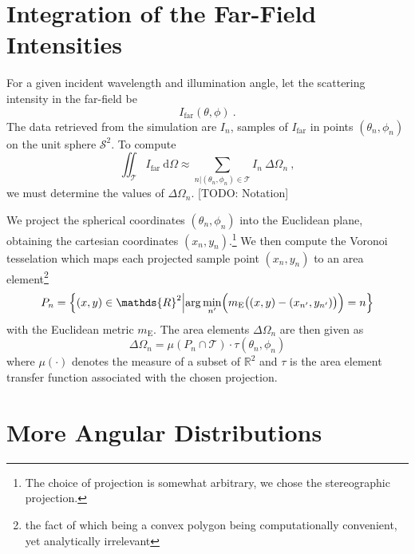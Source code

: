 \documentclass[10pt]{article}
\begin{document}
\section*{Integration of the Far-Field Intensities}

For a given incident wavelength and illumination angle, let the scattering intensity in the far-field be
$$I_\mathrm{far}(\theta,\phi)\ .$$
The data retrieved from the simulation are $I_n$, samples of $I_\mathrm{far}$ in points $\left( \theta_n, \phi_n \right)$ on the unit sphere $\mathcal{S}^2$. 
To compute
$$
    \iint_{\mathcal{T}} I_\mathrm{far} \ \mathrm{d}\Omega \approx \sum_{n \vert \left( \theta_n, \phi_n \right)\in\mathcal{T}} I_n \ \Delta\Omega_n \ , 
$$
we must determine the values of $\Delta\Omega_n$. [TODO: Notation]

We project the spherical coordinates $\left( \theta_n, \phi_n \right)$ into the Euclidean plane, obtaining the cartesian coordinates $(x_n, y_n)$.\footnote{The choice of projection is somewhat arbitrary, we chose the stereographic projection.} 
We then compute the Voronoi tesselation which maps each projected sample point $(x_n, y_n)$ to an area element\footnote{the fact of which being a convex polygon being computationally convenient, yet analytically irrelevant} 
$$
P_n = \left\lbrace 
(x,y) \in \mathds{R}^2 
\middle\vert 
\mathrm{arg}\min\limits_{n'} \Bigl( m_\mathrm{E}\bigl( (x,y)-(x_{n'},y_{n'}) \bigr) \Bigr)
= n
\right\rbrace
$$ 
with the Euclidean metric $m_\mathrm{E}$. 
The area elements $\Delta\Omega_n$ are then given as 
$$
\Delta\Omega_n
=
\mu\left(
P_n \cap \mathcal{T}
\right) \cdot \tau\left( \theta_n, \phi_n \right)
$$
where $\mu(\cdot)$ denotes the measure of a subset of $\mathds{R}^2$ and $\tau$ is the area element transfer function associated with the chosen projection. 









\section*{More Angular Distributions}
\end{document}
